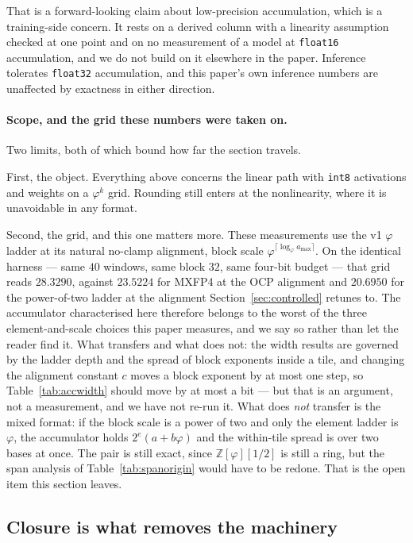 \documentclass[11pt]{article}
\theoremstyle{definition}
\begin{document}
That is a forward-looking claim about low-precision accumulation, which is a
training-side concern. It rests on a derived column with a linearity assumption
checked at one point and on no measurement of a model at \texttt{float16}
accumulation, and we do not build on it elsewhere in the paper. Inference
tolerates \texttt{float32} accumulation, and this paper's own inference numbers
are unaffected by exactness in either direction.

\paragraph{Scope, and the grid these numbers were taken on.} Two limits, both of
which bound how far the section travels.

First, the object. Everything above concerns the linear path with \texttt{int8}
activations and weights on a $\varphi^{k}$ grid. Rounding still enters at the
nonlinearity, where it is unavoidable in any format.

Second, the grid, and this one matters more. These measurements use the v1
$\varphi$ ladder at its natural no-clamp alignment, block scale
$\varphi^{\lceil\log_\varphi a_{\max}\rceil}$. On the identical harness --- same
$40$ windows, same block $32$, same four-bit budget --- that grid reads
$28.3290$, against $23.5224$ for MXFP4 at the OCP alignment and $20.6950$ for the
power-of-two ladder at the alignment Section~\ref{sec:controlled} retunes to. The
accumulator characterised here therefore belongs to the worst of the three
element-and-scale choices this paper measures, and we say so rather than let the
reader find it. What transfers and what does not: the width results are governed
by the ladder depth and the spread of block exponents inside a tile, and changing
the alignment constant $c$ moves a block exponent by at most one step, so
Table~\ref{tab:accwidth} should move by at most a bit --- but that is an
argument, not a measurement, and we have not re-run it. What does \emph{not}
transfer is the mixed format: if the block scale is a power of two and only the
element ladder is $\varphi$, the accumulator holds $2^{e}(a + b\varphi)$ and the
within-tile spread is over two bases at once. The pair is still exact, since
$\mathbb{Z}[\varphi][1/2]$ is still a ring, but the span analysis of
Table~\ref{tab:spanorigin} would have to be redone. That is the open item this
section leaves.
\subsection{Closure is what removes the machinery}\label{sec:closure}
\end{document}
